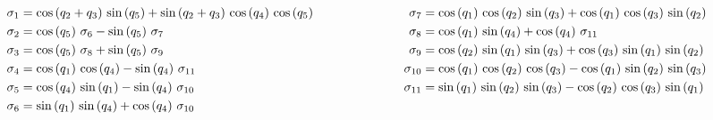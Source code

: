 \documentclass[11pt, a4paper]{article}
\begin{document}
\begin{lrbox}{\rotpagebox}
\begin{minipage}[t][\textwidth][t]{\textheight}
\[
\begin{aligned}
\sigma_1 &= \cos \left(q_2 +q_3 \right)\,\sin \left(q_5 \right)+\sin \left(q_2 +q_3 \right)\,\cos \left(q_4 \right)\,\cos \left(q_5 \right) &\hspace{2.2cm} \sigma_7 &= \cos \left(q_1 \right)\,\cos \left(q_2 \right)\,\sin \left(q_3 \right)+\cos \left(q_1 \right)\,\cos \left(q_3 \right)\,\sin \left(q_2 \right) \\
\sigma_2 &= \cos \left(q_5 \right)\,\sigma_6 -\sin \left(q_5 \right)\,\sigma_7 &\hspace{2.2cm} \sigma_8 &= \cos \left(q_1 \right)\,\sin \left(q_4 \right)+\cos \left(q_4 \right)\,\sigma_{11} \\
\sigma_3 &= \cos \left(q_5 \right)\,\sigma_8 +\sin \left(q_5 \right)\,\sigma_9 &\hspace{2.2cm} \sigma_9 &= \cos \left(q_2 \right)\,\sin \left(q_1 \right)\,\sin \left(q_3 \right)+\cos \left(q_3 \right)\,\sin \left(q_1 \right)\,\sin \left(q_2 \right) \\
\sigma_4 &= \cos \left(q_1 \right)\,\cos \left(q_4 \right)-\sin \left(q_4 \right)\,\sigma_{11} &\hspace{2.2cm} \sigma_{10} &= \cos \left(q_1 \right)\,\cos \left(q_2 \right)\,\cos \left(q_3 \right)-\cos \left(q_1 \right)\,\sin \left(q_2 \right)\,\sin \left(q_3 \right) \\
\sigma_5 &= \cos \left(q_4 \right)\,\sin \left(q_1 \right)-\sin \left(q_4 \right)\,\sigma_{10} &\hspace{2.2cm} \sigma_{11} &= \sin \left(q_1 \right)\,\sin \left(q_2 \right)\,\sin \left(q_3 \right)-\cos \left(q_2 \right)\,\cos \left(q_3 \right)\,\sin \left(q_1 \right) \\
\sigma_6 &= \sin \left(q_1 \right)\,\sin \left(q_4 \right)+\cos \left(q_4 \right)\,\sigma_{10} &\hspace{2.2cm}
\end{aligned}
\]
\end{minipage}
\end{lrbox}
\noindent{}
\end{document}
